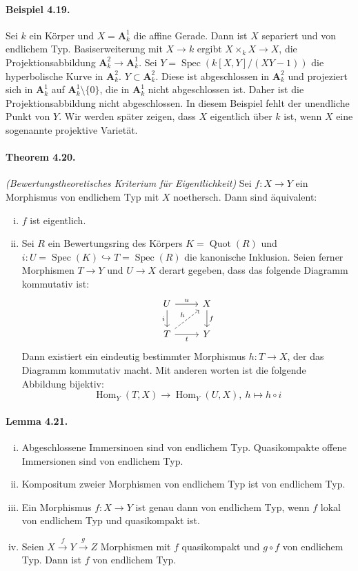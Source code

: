\paragraph{Beispiel 4.19.}\label{4.19} Sei $k$ ein Körper und $X=\mathbf{A}_k^1$ die affine Gerade. Dann ist $X$ separiert und von endlichem Typ. Basiserweiterung mit $X\to k$ ergibt $X\times_kX\to X$, die Projektionsabbildung $\mathbf{A}_k^2\to\mathbf{A}_k^1$. Sei $Y=\operatorname{Spec}(k[X,Y]/(XY-1))$ die hyperbolische Kurve in $\mathbf{A}_k^2$. $Y\subset\mathbf{A}_k^2$. Diese ist abgeschlossen in $\mathbf{A}_k^2$ und projeziert sich in $\mathbf{A}_k^1$ auf $\mathbf{A}_k^1\setminus\{0\}$, die in $\mathbf{A}_k^1$ nicht abgeschlossen ist. Daher ist die Projektionsabbildung nicht abgeschlossen. In diesem Beispiel fehlt der unendliche Punkt von $Y$. Wir werden später zeigen, dass $X$ eigentlich über $k$ ist, wenn $X$ eine sogenannte projektive Varietät.

\paragraph{Theorem 4.20.}\label{4.20} \textit{(Bewertungstheoretisches Kriterium für Eigentlichkeit)} Sei $f:X\to Y$ ein Morphismus von endlichem Typ mit $X$ noethersch. Dann sind äquivalent:
\begin{enumerate}[(i)]
\item $f$ ist eigentlich.
\item Sei $R$ ein Bewertungsring des Körpers $K=\operatorname{Quot}(R)$ und $i:U=\operatorname{Spec}(K)\hookrightarrow T=\operatorname{Spec}(R)$ die kanonische Inklusion. Seien ferner Morphismen $T\to Y$ und $U\to X$ derart gegeben, dass das folgende Diagramm kommutativ ist:
\[\begin{tikzcd}
U\ar[r, "u"]\ar[d, "i"'] & X\ar[d, "f"]\\
T\ar[r, "t"']\ar[ru, "h", dashed] & Y
\end{tikzcd}\]
Dann existiert ein eindeutig bestimmter Morphismus $h:T\to X$, der das Diagramm kommutativ macht. Mit anderen worten ist die folgende Abbildung bijektiv:
\[\operatorname{Hom}_Y(T,X)\to\operatorname{Hom}_Y(U,X),\ h\mapsto h\circ i \]
\end{enumerate}

\paragraph{Lemma 4.21.}\label{4.21} \begin{enumerate}[(i)]
\item Abgeschlossene Immersinoen sind von endlichem Typ. Quasikompakte offene Immersionen sind von endlichem Typ.
\item Kompositum zweier Morphismen von endlichem Typ ist von endlichem Typ.
\item Ein Morphismus $f:X\to Y$ ist genau dann von endlichem Typ, wenn $f$ lokal von endlichem Typ und quasikompakt ist.
\item Seien $X\stackrel{f}{\to}Y\stackrel{g}{\to}Z$ Morphismen mit $f$ quasikompakt und $g\circ f$ von endlichem Typ. Dann ist $f$ von endlichem Typ.
\end{enumerate}

